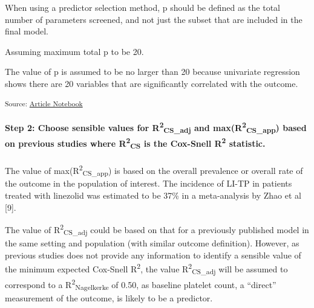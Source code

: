 \documentclass[
  letterpaper,
  DIV=11,
  numbers=noendperiod]{scrartcl}
\let\oldparagraph\paragraph
\renewcommand{\paragraph}[1]{\oldparagraph{#1}\mbox{}}
\begin{document}
When using a predictor selection method, p should be defined as the
total number of parameters screened, and not just the subset that are
included in the final model.

Assuming maximum total p to be 20.

\begin{tcolorbox}[enhanced jigsaw, left=2mm, title=\textcolor{quarto-callout-note-color}{\faInfo}\hspace{0.5em}{Note}, breakable, bottomtitle=1mm, coltitle=black, colframe=quarto-callout-note-color-frame, colbacktitle=quarto-callout-note-color!10!white, toprule=.15mm, bottomrule=.15mm, colback=white, toptitle=1mm, titlerule=0mm, leftrule=.75mm, opacityback=0, rightrule=.15mm, arc=.35mm, opacitybacktitle=0.6]

The value of p is assumed to be no larger than 20 because univariate
regression shows there are 20 variables that are significantly
correlated with the outcome.

\end{tcolorbox}

\textsubscript{Source:
\href{https://AnTangQuoc.github.io/LZD-TP-pred-model/index.qmd.html}{Article
Notebook}}

\paragraph{\texorpdfstring{Step 2: Choose sensible values for
R\textsuperscript{2}\textsubscript{CS\_adj} and
max(R\textsuperscript{2}\textsubscript{CS\_app}) based on previous
studies where R\textsuperscript{2}\textsubscript{CS} is the Cox-Snell
R\textsuperscript{2}
statistic.}{Step 2: Choose sensible values for R2CS\_adj and max(R2CS\_app) based on previous studies where R2CS is the Cox-Snell R2 statistic.}}\label{step-2-choose-sensible-values-for-r2cs_adj-and-maxr2cs_app-based-on-previous-studies-where-r2cs-is-the-cox-snell-r2-statistic.}

The value of max(R\textsuperscript{2}\textsubscript{CS\_app}) is based
on the overall prevalence or overall rate of the outcome in the
population of interest. The incidence of LI-TP in patients treated with
linezolid was estimated to be 37\% in a meta-analysis by Zhao et al
{[}9{]}.

The value of R\textsuperscript{2}\textsubscript{CS\_adj} could be based
on that for a previously published model in the same setting and
population (with similar outcome definition). However, as previous
studies does not provide any information to identify a sensible value of
the minimum expected Cox-Snell R\textsuperscript{2}, the value
R\textsuperscript{2}\textsubscript{CS\_adj} will be assumed to
correspond to a R\textsuperscript{2}\textsubscript{Nagelkerke} of 0.50,
as baseline platelet count, a ``direct'' measurement of the outcome, is
likely to be a predictor.
\end{document}
